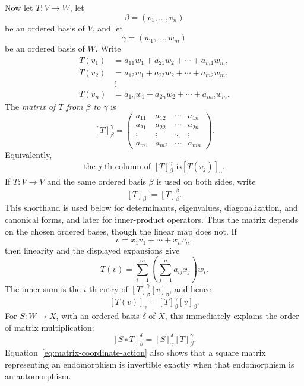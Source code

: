 Now let \(T:V\to W\), let
\[
\beta=(v_1,\ldots,v_n)
\]
be an ordered basis of \(V\), and let
\[
\gamma=(w_1,\ldots,w_m)
\]
be an ordered basis of \(W\). Write
\[
\begin{aligned}
T(v_1)&=a_{11}w_1+a_{21}w_2+\cdots+a_{m1}w_m,\\
T(v_2)&=a_{12}w_1+a_{22}w_2+\cdots+a_{m2}w_m,\\
&\ \vdots\\
T(v_n)&=a_{1n}w_1+a_{2n}w_2+\cdots+a_{mn}w_m.
\end{aligned}
\]
The \emph{matrix of \(T\) from \(\beta\) to \(\gamma\)} is
\[
[T]^\gamma_\beta=
\begin{pmatrix}
a_{11}&a_{12}&\cdots&a_{1n}\\
a_{21}&a_{22}&\cdots&a_{2n}\\
\vdots&\vdots&\ddots&\vdots\\
a_{m1}&a_{m2}&\cdots&a_{mn}
\end{pmatrix}.
\]
Equivalently,
\[
\boxed{\text{the \(j\)-th column of \([T]^\gamma_\beta\) is
\([T(v_j)]_\gamma\).}}
\]
If \(T:V\to V\) and the same ordered basis \(\beta\) is used on both sides,
write
\[
[T]_\beta:=[T]^\beta_\beta.
\]
This shorthand is used below for determinants, eigenvalues, diagonalization,
and canonical forms, and later for inner-product operators.
Thus the matrix depends on the chosen ordered bases, though the linear map
does not. If
\[
v=x_1v_1+\cdots+x_nv_n,
\]
then linearity and the displayed expansions give
\[
T(v)
=\sum_{i=1}^m\left(\sum_{j=1}^n a_{ij}x_j\right)w_i.
\]
The inner sum is the \(i\)-th entry of
\([T]^\gamma_\beta[v]_\beta\), and hence
\begin{equation}\label{eq:matrix-coordinate-action}
[T(v)]_\gamma=[T]^\gamma_\beta[v]_\beta.
\end{equation}
For \(S:W\to X\), with an ordered basis \(\delta\) of \(X\), this immediately
explains the order of matrix multiplication:
\[
[S\circ T]^\delta_\beta=[S]^\delta_\gamma[T]^\gamma_\beta.
\]
Equation~\eqref{eq:matrix-coordinate-action} also shows that a square matrix representing an endomorphism is
invertible exactly when that endomorphism is an automorphism.

